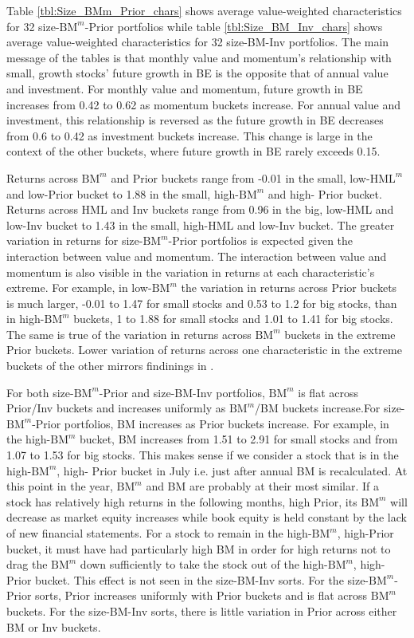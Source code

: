 
Table \ref{tbl:Size_BMm_Prior_chars} shows average value-weighted
characteristics for 32 size-$\text{BM}^m$-Prior portfolios while table
\ref{tbl:Size_BM_Inv_chars} shows average value-weighted characteristics for 32
size-BM-Inv portfolios. The main message of the tables is that monthly value
and momentum's relationship with small, growth stocks' future growth in BE is
the opposite that of annual value and investment. For monthly value and
momentum, future growth in BE increases from 0.42 to 0.62 as momentum buckets
increase. For annual value and investment, this relationship is reversed as the
future growth in BE decreases from 0.6 to 0.42 as investment buckets increase.
This change is large in the context of the other buckets, where future growth
in BE rarely exceeds 0.15.

Returns across $\text{BM}^m$ and Prior buckets range from -0.01 in the small,
low-$\text{HML}^m$ and low-Prior bucket to 1.88 in the small,
high-$\text{BM}^m$ and high- Prior bucket. Returns across HML and Inv buckets
range from 0.96 in the big, low-HML and low-Inv bucket to 1.43 in the small,
high-HML and low-Inv bucket. The greater variation in returns for
size-$\text{BM}^m$-Prior portfolios is expected given the interaction between
value and momentum. The interaction between value and momentum is also visible
in the variation in returns at each characteristic's extreme. For example, in
low-$\text{BM}^m$ the variation in returns across Prior buckets is much larger,
-0.01 to 1.47 for small stocks and 0.53 to 1.2 for big stocks, than in
high-$\text{BM}^m$ buckets, 1 to 1.88 for small stocks and 1.01 to 1.41 for big
stocks. The same is true of the variation in returns across $\text{BM}^m$
buckets in the extreme Prior buckets. Lower variation of returns across one
characteristic in the extreme buckets of the other mirrors findinings in
\textcite{asness2013devil}.

For both size-$\text{BM}^m$-Prior and size-BM-Inv portfolios, $\text{BM}^m$ is
flat across Prior/Inv buckets and increases uniformly as $\text{BM}^m$/BM
buckets increase.For size-$\text{BM}^m$-Prior portfolios, BM increases as Prior
buckets increase. For example, in the high-$\text{BM}^m$ bucket, BM increases
from 1.51 to 2.91 for small stocks and from 1.07 to 1.53 for big stocks. This
makes sense if we consider a stock that is in the high-$\text{BM}^m$, high-
Prior bucket in July i.e. just after annual BM is recalculated. At this point
in the year, $\text{BM}^m$ and BM are probably at their most similar. If a
stock has relatively high returns in the following months, high Prior, its
$\text{BM}^m$ will decrease as market equity increases while book equity is
held constant by the lack of new financial statements. For a stock to remain in
the high-$\text{BM}^m$, high-Prior bucket, it must have had particularly high
BM in order for high returns not to drag the $\text{BM}^m$ down sufficiently to
take the stock out of the high-$\text{BM}^m$, high- Prior bucket. This effect
is not seen in the size-BM-Inv sorts. For the size-$\text{BM}^m$-Prior sorts,
Prior increases uniformly with Prior buckets and is flat across $\text{BM}^m$
buckets. For the size-BM-Inv sorts, there is little variation in Prior across
either BM or Inv buckets.

